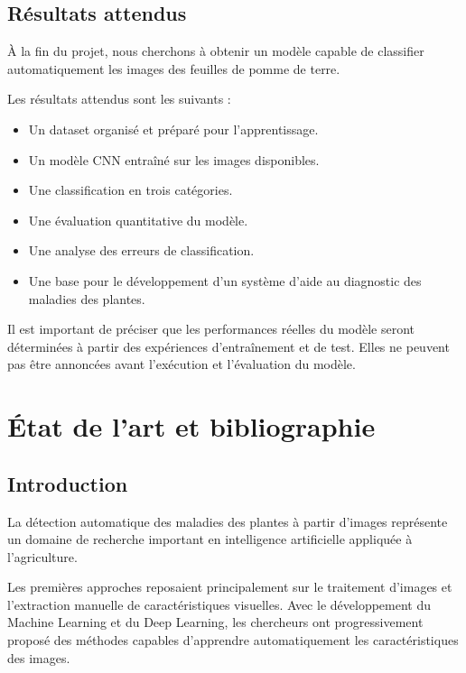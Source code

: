 \documentclass[12pt,a4paper,oneside]{report}
\begin{document}
\section{Résultats attendus}

À la fin du projet, nous cherchons à obtenir un modèle
capable de classifier automatiquement les images des
feuilles de pomme de terre.

Les résultats attendus sont les suivants :

\begin{itemize}
    \item Un dataset organisé et préparé pour l'apprentissage.
    \item Un modèle CNN entraîné sur les images disponibles.
    \item Une classification en trois catégories.
    \item Une évaluation quantitative du modèle.
    \item Une analyse des erreurs de classification.
    \item Une base pour le développement d'un système
    d'aide au diagnostic des maladies des plantes.
\end{itemize}

Il est important de préciser que les performances réelles
du modèle seront déterminées à partir des expériences
d'entraînement et de test. Elles ne peuvent pas être
annoncées avant l'exécution et l'évaluation du modèle.


\chapter{État de l'art et bibliographie}

\section{Introduction}

La détection automatique des maladies des plantes à partir
d'images représente un domaine de recherche important
en intelligence artificielle appliquée à l'agriculture.

Les premières approches reposaient principalement sur
le traitement d'images et l'extraction manuelle de
caractéristiques visuelles. Avec le développement du
Machine Learning et du Deep Learning, les chercheurs
ont progressivement proposé des méthodes capables
d'apprendre automatiquement les caractéristiques des images.
\end{document}
